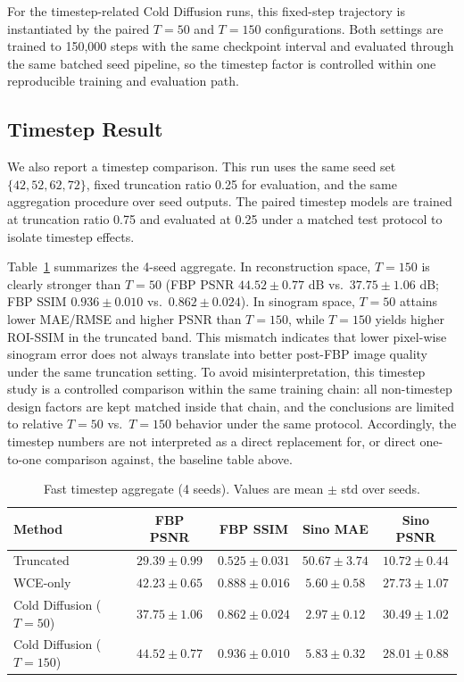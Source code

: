 For the timestep-related Cold Diffusion runs, this fixed-step trajectory is instantiated by the paired \(T=50\) and \(T=150\) configurations. Both settings are trained to 150,000 steps with the same checkpoint interval and evaluated through the same batched seed pipeline, so the timestep factor is controlled within one reproducible training and evaluation path.

\subsection{Timestep Result}

We also report a timestep comparison. This run uses the same seed set \(\{42,52,62,72\}\), fixed truncation ratio 0.25 for evaluation, and the same aggregation procedure over seed outputs. The paired timestep models are trained at truncation ratio 0.75 and evaluated at 0.25 under a matched test protocol to isolate timestep effects.

Table~\ref{tab:Timestep_summary} summarizes the 4-seed aggregate. In reconstruction space, \(T=150\) is clearly stronger than \(T=50\) (FBP PSNR \(44.52\pm0.77\) dB vs.\ \(37.75\pm1.06\) dB; FBP SSIM \(0.936\pm0.010\) vs.\ \(0.862\pm0.024\)). In sinogram space, \(T=50\) attains lower MAE/RMSE and higher PSNR than \(T=150\), while \(T=150\) yields higher ROI-SSIM in the truncated band. This mismatch indicates that lower pixel-wise sinogram error does not always translate into better post-FBP image quality under the same truncation setting.
To avoid misinterpretation, this timestep study is a controlled comparison within the same training chain: all non-timestep design factors are kept matched inside that chain, and the conclusions are limited to relative \(T=50\) vs.\ \(T=150\) behavior under the same protocol. Accordingly, the timestep numbers are not interpreted as a direct replacement for, or direct one-to-one comparison against, the baseline table above.

\begin{table}[htbp]
\centering
\caption{Fast timestep aggregate (4 seeds). Values are mean \(\pm\) std over seeds.}
\label{tab:Timestep_summary}
\begin{tabular}{lcccc}
\toprule
\textbf{Method} & \textbf{FBP PSNR} & \textbf{FBP SSIM} & \textbf{Sino MAE} & \textbf{Sino PSNR} \\
\midrule
Truncated & \(29.39 \pm 0.99\) & \(0.525 \pm 0.031\) & \(50.67 \pm 3.74\) & \(10.72 \pm 0.44\) \\
WCE-only & \(42.23 \pm 0.65\) & \(0.888 \pm 0.016\) & \(5.60 \pm 0.58\) & \(27.73 \pm 1.07\) \\
Cold Diffusion (\(T=50\)) & \(37.75 \pm 1.06\) & \(0.862 \pm 0.024\) & \(2.97 \pm 0.12\) & \(30.49 \pm 1.02\) \\
Cold Diffusion (\(T=150\)) & \(44.52 \pm 0.77\) & \(0.936 \pm 0.010\) & \(5.83 \pm 0.32\) & \(28.01 \pm 0.88\) \\
\bottomrule
\end{tabular}
\end{table}

